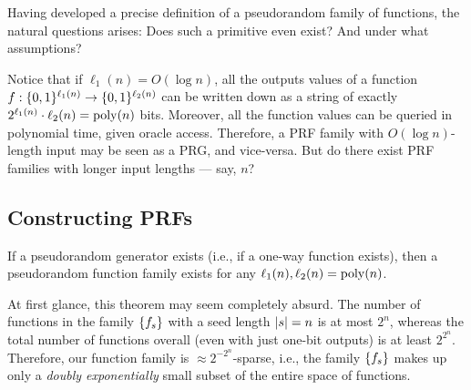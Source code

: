 \documentclass[11pt]{article}
\begin{document}
Having developed a precise definition of a pseudorandom family of
functions, the natural questions arises: Does such a primitive even
exist?  And under what assumptions?

Notice that if $\ell_{1}(n) = O(\log n)$, all the outputs values of a
function $f : \{0,1\}^{\ell_{1}(n)} \to \{0,1\}^{\ell_{2}(n)}$ can be
written down as a string of exactly $2^{\ell_{1}(n)} \cdot \ell_{2}(n)
= \operatorname{poly}(n)$ bits.  Moreover, all the function values can be queried in
polynomial time, given oracle access.  Therefore, a PRF family with
$O(\log n)$-length input may be seen as a PRG, and vice-versa.  But do
there exist PRF families with longer input lengths --- say, $n$?

\subsection{Constructing PRFs}
\label{sec:constructing-prfs}

\begin{theorem}
  \label{thm:prg-implies-prf}
  If a pseudorandom generator exists (i.e., if a one-way function
  exists), then a pseudorandom function family exists for any
  $\ell_{1}(n), \ell_{2}(n) = \operatorname{poly}(n)$.
\end{theorem}

At first glance, this theorem may seem completely absurd.  The number
of functions in the family $\{f_{s}\}$ with a seed length $\lvert s\rvert =
n$ is at most $2^n$, whereas the total number of functions overall
(even with just one-bit outputs) is at least $2^{2^{n}}$.  Therefore,
our function family is $\approx 2^{-2^{n}}$-sparse, i.e., the family
$\{f_s\}$ makes up only a \emph{doubly exponentially} small subset
of the entire space of functions.
\end{document}
